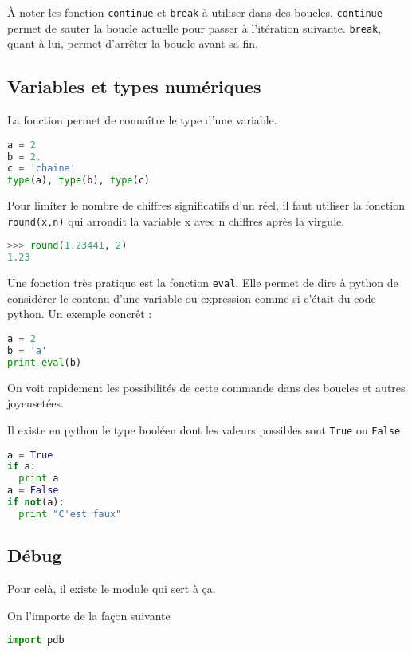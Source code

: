 \documentclass[a4paper,twoside]{article}
\begin{document}
\begin{remarque}
À noter les fonction \texttt{continue} et \texttt{break} à utiliser dans des boucles. \texttt{continue} permet de sauter la boucle actuelle pour passer à l'itération suivante. \texttt{break}, quant à lui, permet d'arrêter la boucle avant sa fin.
\end{remarque}



\subsection{Variables et types numériques}

La fonction  permet de connaître le type d'une variable.
\begin{lstlisting}[language=python]
a = 2
b = 2.
c = 'chaine'
type(a), type(b), type(c)
\end{lstlisting}

Pour limiter le nombre de chiffres significatifs d'un réel, il faut utiliser la fonction \texttt{round(x,n)} qui arrondit la variable x avec n chiffres après la virgule.
\begin{lstlisting}[language=python]
>>> round(1.23441, 2)
1.23
\end{lstlisting}

Une fonction très pratique est la fonction \texttt{eval}. Elle permet de dire à python de considérer le contenu d'une variable ou expression comme si c'était du code python. Un exemple concrêt :
\begin{lstlisting}[language=python]
a = 2
b = 'a'
print eval(b)
\end{lstlisting}

On voit rapidement les possibilités de cette commande dans des boucles et autres joyeusetées.

\bigskip

Il existe en python le type booléen dont les valeurs possibles sont \texttt{True} ou \texttt{False}
\begin{lstlisting}[language=python]
a = True
if a:
  print a
a = False
if not(a):
  print "C'est faux"
\end{lstlisting}

\subsection{Débug}
Pour celà, il existe le module  qui sert à ça.

On l'importe de la façon suivante
\begin{lstlisting}[language=python]
import pdb
\end{lstlisting}
\end{document}
